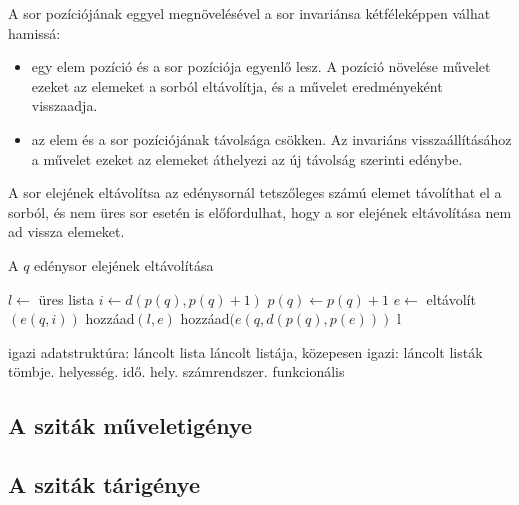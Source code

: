 A sor pozíciójának eggyel megnövelésével a sor invariánsa kétféleképpen válhat hamissá:
\begin{itemize}
\item egy elem pozíció és a sor pozíciója egyenlő lesz. A pozíció növelése művelet ezeket az elemeket a sorból eltávolítja, és a művelet eredményeként visszaadja.
\item az elem és a sor pozíciójának távolsága csökken. Az invariáns visszaállításához a művelet ezeket az elemeket áthelyezi az új távolság szerinti edénybe.
\end{itemize}
A sor elejének eltávolítsa az edénysornál tetszőleges számú elemet távolíthat el a sorból, és nem üres sor esetén is előfordulhat, hogy a sor elejének eltávolítása nem ad vissza elemeket.

\begin{algorithm}
\caption{A $q$ edénysor elejének eltávolítása}
\label{alg:buckets-remove-min}
\begin{algorithmic}[1]
	\State $l \gets$ üres lista
	\State $i \gets d(p(q), p(q)+1)$
	\State $p(q) \gets p(q)+1$
		\State $e \gets$ eltávolít$(e(q, i))$
			\State hozzáad$(l, e)$
		\Else
			\State hozzáad$(e(q, d(p(q), p(e)))$
		\EndIf
	\EndWhile
	\State \Return l
\EndFunction
\end{algorithmic}
\end{algorithm}

{\color{red}igazi adatstruktúra: láncolt lista láncolt listája, közepesen igazi: láncolt listák tömbje. helyesség. idő. hely. számrendszer. funkcionális}

\subsection{A sziták műveletigénye}

\subsection{A sziták tárigénye}
